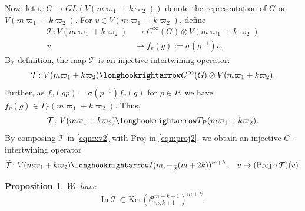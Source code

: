 \documentclass[reqno,11pt]{amsart}
\newtheorem{prop}[equation]{Proposition}
\theoremstyle{remark}
\numberwithin{equation}{section}
\newcommand{\Cal}{\mathcal}
\renewcommand{\Im}{\mathrm{Im}}
\newcommand{\To}{\longrightarrow}
\newcommand{\wT}{\widetilde{\Cal{T}}}
\newcommand{\Proj}{\mathrm{Proj}}
\newcommand{\Ker}{\mathrm{Ker}}
\begin{document}
Now, let $\sigma\colon G \to GL(V(m\varpi_1 + k \varpi_2))$ denote the representation
of $G$ on $V(m\varpi_1 + k \varpi_2)$. For $v \in V(m\varpi_1 + k \varpi_2)$, define
\begin{align*}
\Cal{T}\colon V(m\varpi_1 + k \varpi_2) 
&\To C^\infty(G)\otimes V(m\varpi_1 + k \varpi_2)\\
v &\longmapsto f_v(g) :=\sigma(g^{-1})v.
\end{align*}
By definition, the map $\Cal{T}$ 
is an injective intertwining operator:
\begin{equation}\label{eqn:xv2}
\Cal{T}\colon V(m\varpi_1 + k\varpi_2) 
\longhookrightarrow C^\infty(G)\otimes V(m\varpi_1 + k\varpi_2).
\end{equation}
Further, as $f_v(gp)=\sigma(p^{-1})f_v(g)$ for $p \in P$, 
we have $f_v(g) \in T_P(m\varpi_1 + k \varpi_2)$. Thus,
\begin{equation}\label{eqn:xv}
\Cal{T}\colon V(m\varpi_1 + k \varpi_2) 
\longhookrightarrow T_P(m\varpi_1 + k \varpi_2).
\end{equation}
By composing $\Cal{T}$ in \eqref{eqn:xv2} with $\Proj$ in \eqref{eqn:proj2}, we obtain
an injective $G$-intertwining operator
\begin{equation}\label{eqn:Tmap}
\wT\colon V(m\varpi_1 + k \varpi_2) 
\longhookrightarrow 
I(m, -\tfrac{1}{2}(m+2k))^{m+k},
\quad v \mapsto (\Proj \circ \Cal{T})(v).
\end{equation}

\begin{prop}\label{prop:TC}
We have 
\begin{equation*}
\Im \wT \subset \Ker \left(\Cal{C}^{m+k+1}_{m,k+1} \right)^{m+k}.
\end{equation*}
\end{prop}
\end{document}

